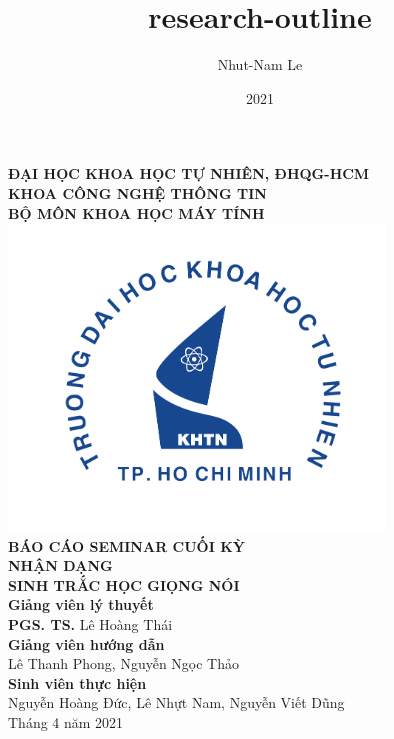 \documentclass{article}
\title{research-outline}
\author{Nhut-Nam Le}
\date{2021}
\newcommand\B{\rule[-1.2ex]{0pt}{0pt}} %
\begin{document}
	\begin{titlepage}
		\begin{center}
			\large{\textbf{ĐẠI HỌC KHOA HỌC TỰ NHIÊN, ĐHQG-HCM\\KHOA CÔNG NGHỆ THÔNG TIN\\BỘ MÔN KHOA HỌC MÁY TÍNH}}\\
			\includegraphics[width=0.75\textwidth]{images/khtn.png}\\
			\large \textbf{BÁO CÁO SEMINAR CUỐI KỲ}\\[0.1in]
			\huge \textbf{NHẬN DẠNG}\\[0.1in]
			\huge \textbf{SINH TRẮC HỌC GIỌNG NÓI}\\[0.1in]
			\vfill
			\normalsize
			\normalsize
			\textbf{Giảng viên lý thuyết}\\
			{\textbf{PGS. TS.} Lê Hoàng Thái}\\[0.1in]
			\textbf{Giảng viên hướng dẫn}\\
			\vspace{0.1in}
			{Lê Thanh Phong, Nguyễn Ngọc Thảo}\\[0.1in]
			\textbf{Sinh viên thực hiện} \\
			\vspace{0.1in}
			{Nguyễn Hoàng Đức, Lê Nhựt Nam, Nguyễn Viết Dũng}\\[0.1in]
			\vfill
			Tháng 4 năm 2021
		\end{center}
	\end{titlepage}
	\newpage
	
	\cleardoublepage
\end{document}
